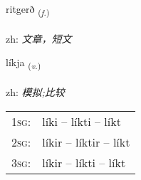 \documentclass[frontgrid, backgrid]{flacards}\usepackage[]{graphicx}\usepackage[]{color}
\begin{document}
\renewcommand{\flhead}{\vskip5pt \fboxsep=0pt {\small\bfseries\footnotesize Nafnorð | 名词}}
\renewcommand{\fcfoot}{\vskip5pt \fboxsep=0pt \hspace{2pt}{\small\bfseries\footnotesize 2K}}

\renewcommand{\blhead}{\vskip5pt {\small\bfseries\footnotesize Nafnorð | 名词 }}
\renewcommand{\bcfoot}{\vskip5pt \hspace{2pt}{\small\bfseries\footnotesize 2K}}


{ritgerð \small{\textsubscript{(\textit{f.})}} \\[1ex] %
\textphonetic{[rɪːtcɛrð]} \\
zh: \emph{文章，短文} \\  [2ex]
\renewcommand*{\arraystretch}{0.8}
}

\renewcommand{\flhead}{\vskip5pt \fboxsep=0pt {\small\bfseries\footnotesize Sagnorð | 动词}}
\renewcommand{\fcfoot}{\vskip5pt \fboxsep=0pt \hspace{2pt}{\small\bfseries\footnotesize 2K}}

\renewcommand{\blhead}{\vskip5pt {\small\bfseries\footnotesize Sagnorð | 动词 }}
\renewcommand{\bcfoot}{\vskip5pt \hspace{2pt}{\small\bfseries\footnotesize 2K}}


{líkja \small{\textsubscript{(\textit{v.})}} \\[1ex] %
\textphonetic{[liːca]} \\
zh: \emph{模拟;比较} \\  [2ex]
\renewcommand*{\arraystretch}{0.8}
\begin{tabular}{p{1cm}l}
\textsc{1sg}: & líki -- líkti -- líkt \\ 
\textsc{2sg}: & líkir -- líktir -- líkt \\ 
\textsc{3sg}: & líkir -- líkti -- líkt \\ 
\end{tabular}
}
\end{document}
